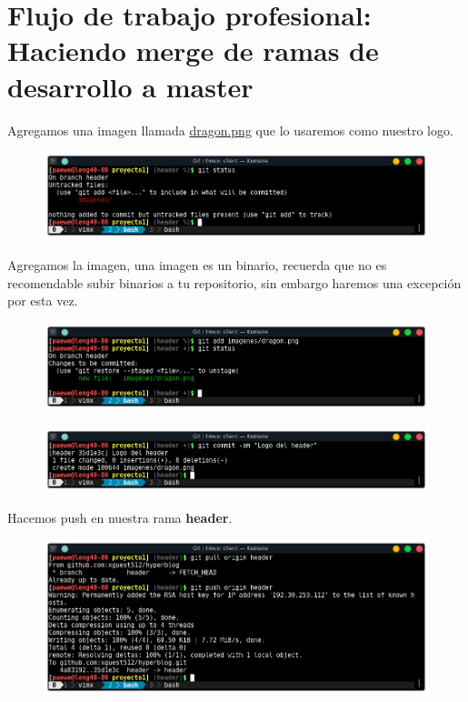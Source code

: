 \documentclass{article}
\begin{document}
\newpage
\section{Flujo de trabajo profesional: Haciendo merge de ramas de desarrollo a master}%

Agregamos una imagen llamada
\href{https://github.com/xguest512/hyperblog/raw/342e14d3f61865ce79a9c20cd72272f228123a0f/imagenes/dragon.png}{dragon.png}
que lo usaremos como nuestro logo.

\begin{figure}[h!]
  \centering
  \includegraphics[scale=0.75]{./Pictures/272_status_logo.png}
\end{figure}

Agregamos la imagen, una imagen es un binario, recuerda que no es recomendable
subir binarios a tu repositorio, sin embargo haremos una excepción por esta
vez.

\begin{figure}[h!]
  \centering
  \includegraphics[scale=0.75]{./Pictures/273_add_dragon.png}
\end{figure}

\begin{figure}[h!]
  \centering
  \includegraphics[scale=0.75]{./Pictures/274_commit.png}
\end{figure}

Hacemos push en nuestra rama \textbf{header}.

\begin{figure}[h!]
  \centering
  \includegraphics[scale=0.75]{./Pictures/275_push_header.png}
\end{figure}
\end{document}
